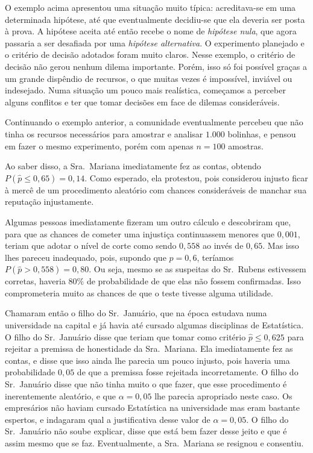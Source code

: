 \documentclass[12pt,a4paper]{article}
\theoremstyle{plain}
\theoremstyle{definition}
\theoremstyle{remark}
\newenvironment{example}{\pushQED{\qed}\renewcommand{\qedsymbol}{\scriptsize$\triangle$}\examplex}{\popQED\endexamplex}
\begin{document}
O exemplo acima apresentou uma situação muito típica: acreditava-se em uma determinada hipótese, até que eventualmente decidiu-se que ela deveria ser posta à prova.
A hipótese aceita até então recebe o nome de \emph{hipótese nula}, que agora passaria a ser desafiada por uma \emph{hipótese alternativa}.
O experimento planejado e o critério de decisão adotados foram muito claros.
Nesse exemplo, o critério de decisão não gerou nenhum dilema importante.
Porém, isso só foi possível graças a um grande dispêndio de recursos, o que muitas vezes é impossível, inviável ou indesejado.
Numa situação um pouco mais realística, começamos a perceber alguns conflitos e ter que tomar decisões em face de dilemas consideráveis.

\begin{example}
Continuando o exemplo anterior, a comunidade eventualmente percebeu que não tinha os recursos necessários para amostrar e analisar $1.000$ bolinhas, e pensou em fazer o mesmo experimento, porém com apenas $n=100$ amostras.

Ao saber disso, a Sra.~Mariana imediatamente fez as contas, obtendo $P(\hat{p} \leq 0,65) = 0,14$. Como esperado, ela protestou, pois considerou injusto ficar à mercê de um procedimento aleatório com chances consideráveis de manchar sua reputação injustamente.

Algumas pessoas imediatamente fizeram um outro cálculo e descobriram que, para que as chances de cometer uma injustiça continuassem menores que $0,001$, teriam que adotar o nível de corte como sendo $0,558$ ao invés de $0,65$.
Mas isso lhes pareceu inadequado, pois, supondo que $p=0,6$, teríamos $P(\hat{p} > 0,558) = 0,80$.
Ou seja, mesmo se as suspeitas do Sr.~Rubens estivessem corretas, haveria $80\%$ de probabilidade de que elas não fossem confirmadas.
Isso comprometeria muito as chances de que o teste tivesse alguma utilidade.

Chamaram então o filho do Sr.~Januário, que na época estudava numa universidade na capital e já havia até cursado algumas disciplinas de Estatística.
O filho do Sr.~Januário disse que teriam que tomar como critério $\hat{p} \leq 0,625$ para rejeitar a premissa de honestidade da Sra.~Mariana.
Ela imediatamente fez as contas, e disse que isso ainda lhe parecia um pouco injusto, pois haveria uma probabilidade $0,05$ de que a premissa fosse rejeitada incorretamente.
O filho do Sr.~Januário disse que não tinha muito o que fazer, que esse procedimento é inerentemente aleatório, e que $\alpha=0,05$ lhe parecia apropriado neste caso.
Os empresários não haviam cursado Estatística na universidade mas eram bastante espertos, e indagaram qual a justificativa desse valor de $\alpha=0,05$.
O filho do Sr.~Januário não soube explicar, disse que está bem fazer desse jeito e que é assim mesmo que se faz.
Eventualmente, a Sra.~Mariana se resignou e consentiu.


\end{example}
\end{document}
